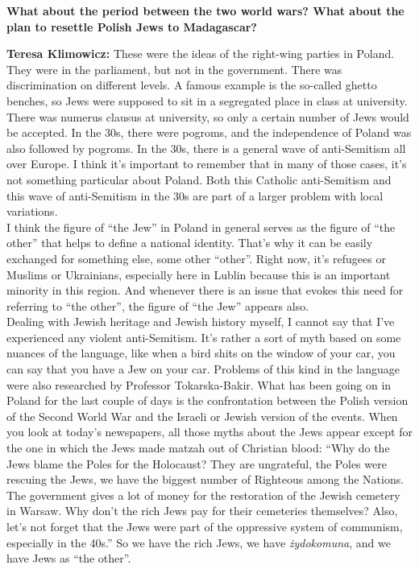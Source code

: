 \textbf{What about the period between the two world wars? What about the plan to resettle Polish Jews to Madagascar?}

\textbf{Teresa Klimowicz:} These were the ideas of the right-wing parties in Poland. They were in the parliament, but not in the government. There was discrimination on different levels. A famous example is the so-called ghetto benches, so Jews were supposed to sit in a segregated place in class at university. There was numerus clausus at university, so only a certain number of Jews would be accepted. In the 30s, there were pogroms, and the independence of Poland was also followed by pogroms. In the 30s, there is a general wave of anti-Semitism all over Europe. I think it's important to remember that in many of those cases, it's not something particular about Poland. Both this Catholic anti-Semitism and this wave of anti-Semitism in the 30s are part of a larger problem with local variations. \\
I think the figure of ``the Jew'' in Poland in general serves as the figure of ``the other'' that helps to define a national identity. That's why it can be easily exchanged for something else, some other ``other''. Right now, it's refugees or Muslims or Ukrainians, especially here in Lublin because this is an important minority in this region. And whenever there is an issue that evokes this need for referring to ``the other'', the figure of ``the Jew'' appears also.\\
Dealing with Jewish heritage and Jewish history myself, I cannot say that I've experienced any violent anti-Semitism. It’s rather a sort of myth based on some nuances of the language, like when a bird shits on the window of your car, you can say that you have a Jew on your car. Problems of this kind in the language were also researched by Professor Tokarska-Bakir. What has been going on in Poland for the last couple of days is the confrontation between the Polish version of the Second World War and the Israeli or Jewish version of the events. When you look at today's newspapers, all those myths about the Jews appear except for the one in which the Jews made matzah out of Christian blood: ``Why do the Jews blame the Poles for the Holocaust? They are ungrateful, the Poles were rescuing the Jews, we have the biggest number of Righteous among the Nations. The government gives a lot of money for the restoration of the Jewish cemetery in Warsaw. Why don't the rich Jews pay for their cemeteries themselves? Also, let’s not forget that the Jews were part of the oppressive system of communism, especially in the 40s.'' So we have the rich Jews, we have \textit{żydokomuna}, and we have Jews as ``the other''.  

